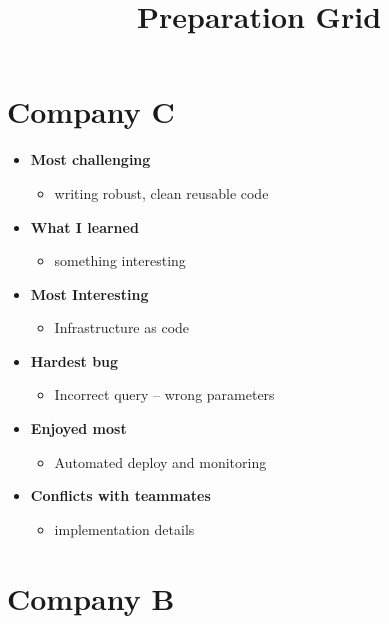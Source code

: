 \documentclass[11pt]{article}
\begin{document}
\title{Preparation Grid}

\maketitle

\section{ Company C}

\begin{itemize}
\item \textbf{Most challenging}
	\begin{itemize}
		 \item{ writing robust, clean reusable code}
	\end{itemize}		
	
\item \textbf{What I learned}
	\begin{itemize}
		 \item{something interesting}
	\end{itemize}		
	
\item \textbf{Most Interesting}
	\begin{itemize}
		\item Infrastructure as code
	\end{itemize}		

\item \textbf{Hardest bug}
	\begin{itemize}
		\item Incorrect  query -- wrong parameters
	\end{itemize}		
		
\item \textbf{Enjoyed most}
	\begin{itemize}
		\item Automated deploy and monitoring
	\end{itemize}		
		
\item \textbf{Conflicts with teammates}
	\begin{itemize}
		\item  implementation details
	\end{itemize}

\end{itemize}


\section{Company B}
\end{document}
